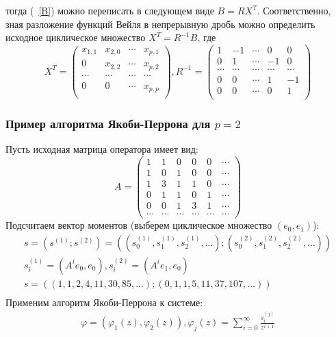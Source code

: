 тогда (~\ref{B}) можно переписать в следующем виде $B=RX^{T}$.
Соответственно, зная разложение функций Вейля в непрерывную дробь
можно определить исходное циклическое множество $X^T=R^{-1}B$, где
$$%
X^T=\left(
\begin{array} {cccccccccccc}
x_{1,1} & x_{2,0} & \cdots & x_{p,1}\\
0       & x_{2,2} & \cdots & x_{p,2}\\
\cdots & \cdots & \cdots & \cdots\\
0 & 0 & \cdots & x_{p,p}\\
\end{array}
\right) ,R^{-1}=\left(
\begin{array} {ccccccccccccccccc}
1 & -1 & \cdots & 0 & 0\\
0 & 1 & \cdots & -1 & 0\\
\cdots & \cdots & \cdots & \cdots & \cdots\\
0 & 0 & \cdots & 1 & -1\\
0 & 0 & \cdots & 0 & 1\\
\end{array}
\right)
$$%



\subsubsection{Пример алгоритма Якоби-Перрона для $p=2$} Пусть
исходная матрица оператора имеет вид:
$$%
A=\left(\begin{array}{cccccc}
1 & 1 & 0 & 0 & 0 & \cdots\\
1 & 0 & 1 & 0 & 0 & \cdots\\
1 & 3 & 1 & 1 & 0 & \cdots\\
0 & 1 & 1 & 0 & 1 & \cdots\\
0 & 0 & 1 & 3 & 1 & \cdots\\
\cdots & \cdots & \cdots & \cdots & \cdots & \cdots
\end{array}\right)
$$%
Подсчитаем вектор моментов (выберем циклическое
множество $(e_0,e_1)$):
$$%
\begin{array}{lll}
s=(s^{(1)};s^{(2)})=((s_0^{(1)},s_1^{(1)},s_2^{(1)},\ldots);(s_0^{(2)},s_1^{(2)},s_2^{(2)},\ldots))\\
s_i^{(1)}=(A^ie_0,e_0),s_i^{(2)}=(A^ie_1,e_0)\\
s=((1,1,2,4,11,30,85,\ldots);(0,1,1,5,11,37,107,\ldots))\\
\end{array}
$$%
Применим алгоритм Якоби-Перрона к системе:
\begin{eqnarray}
\varphi=(\varphi_1(z),\varphi_2(z)),\varphi_j(z)=\sum_{i=0}^{\infty}{\frac{s_i^{(j)}}{z^{i+1}}}\nonumber
\end{eqnarray}


